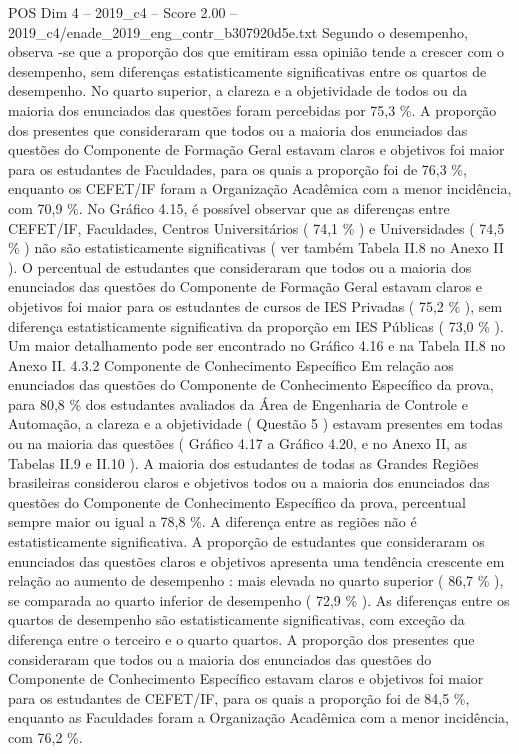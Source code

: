 \begin{textsample}{POS Dim 4 – 2019\_c4 – Score 2.00 – 2019\_c4/enade\_2019\_eng\_contr\_b307920d5e.txt}
Segundo o desempenho, observa -se que a proporção dos que emitiram essa opinião tende a crescer com o desempenho, sem diferenças estatisticamente significativas entre os quartos de desempenho.
No quarto superior, a clareza e a objetividade de todos ou da maioria dos enunciados das questões foram percebidas por 75,3 \%.
A proporção dos presentes que consideraram que todos ou a maioria dos enunciados das questões do Componente de Formação Geral estavam claros e objetivos foi maior para os estudantes de Faculdades, para os quais a proporção foi de 76,3 \%, enquanto os CEFET/IF foram a Organização Acadêmica com a menor incidência, com 70,9 \%.
No Gráfico 4.15, é possível observar que as diferenças entre CEFET/IF, Faculdades, Centros Universitários ( 74,1 \% ) e Universidades ( 74,5 \% ) não são estatisticamente significativas ( ver também Tabela II.8 no Anexo II ).
O percentual de estudantes que consideraram que todos ou a maioria dos enunciados das questões do Componente de Formação Geral estavam claros e objetivos foi maior para os estudantes de cursos de IES Privadas ( 75,2 \% ), sem diferença estatisticamente significativa da proporção em IES Públicas ( 73,0 \% ).
Um maior detalhamento pode ser encontrado no Gráfico 4.16 e na Tabela II.8 no Anexo II. 4.3.2 Componente de Conhecimento Específico Em relação aos enunciados das questões do Componente de Conhecimento Específico da prova, para 80,8 \% dos estudantes avaliados da Área de Engenharia de Controle e Automação, a clareza e a objetividade ( Questão 5 ) estavam presentes em todas ou na maioria das questões ( Gráfico 4.17 a Gráfico 4.20, e no Anexo II, as Tabelas II.9 e II.10 ).
A maioria dos estudantes de todas as Grandes Regiões brasileiras considerou claros e objetivos todos ou a maioria dos enunciados das questões do Componente de Conhecimento Específico da prova, percentual sempre maior ou igual a 78,8 \%.
A diferença entre as regiões não é estatisticamente significativa.
A proporção de estudantes que consideraram os enunciados das questões claros e objetivos apresenta uma tendência crescente em relação ao aumento de desempenho : mais elevada no quarto superior ( 86,7 \% ), se comparada ao quarto inferior de desempenho ( 72,9 \% ).
As diferenças entre os quartos de desempenho são estatisticamente significativas, com exceção da diferença entre o terceiro e o quarto quartos.
A proporção dos presentes que consideraram que todos ou a maioria dos enunciados das questões do Componente de Conhecimento Específico estavam claros e objetivos foi maior para os estudantes de CEFET/IF, para os quais a proporção foi de 84,5 \%, enquanto as Faculdades foram a Organização Acadêmica com a menor incidência, com 76,2 \%.

\end{textsample}
